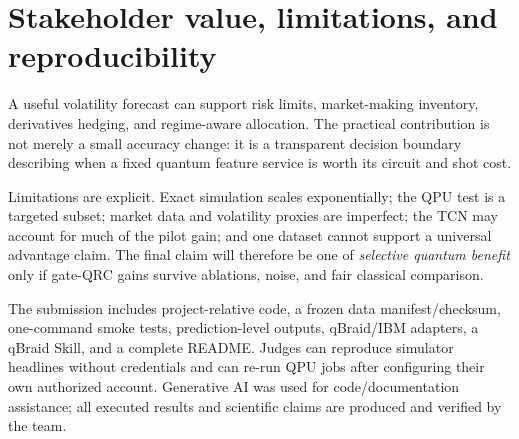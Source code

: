 \documentclass[11pt]{article}
\begin{document}
\section{Stakeholder value, limitations, and reproducibility}
A useful volatility forecast can support risk limits, market-making inventory, derivatives hedging, and regime-aware allocation. The practical contribution is not merely a small accuracy change: it is a transparent decision boundary describing when a fixed quantum feature service is worth its circuit and shot cost.

Limitations are explicit. Exact simulation scales exponentially; the QPU test is a targeted subset; market data and volatility proxies are imperfect; the TCN may account for much of the pilot gain; and one dataset cannot support a universal advantage claim. The final claim will therefore be one of \emph{selective quantum benefit} only if gate-QRC gains survive ablations, noise, and fair classical comparison.

The submission includes project-relative code, a frozen data manifest/checksum, one-command smoke tests, prediction-level outputs, qBraid/IBM adapters, a qBraid Skill, and a complete README. Judges can reproduce simulator headlines without credentials and can re-run QPU jobs after configuring their own authorized account. Generative AI was used for code/documentation assistance; all executed results and scientific claims are produced and verified by the team.
\end{document}

